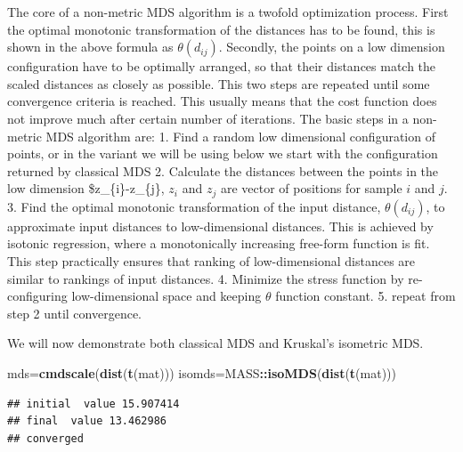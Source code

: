 \documentclass[12pt,]{krantz}
\newenvironment{Shaded}{\begin{snugshade}}{\end{snugshade}}
\newcommand{\CommentTok}[1]{\textcolor[rgb]{0.56,0.35,0.01}{\textit{#1}}}
\newcommand{\DataTypeTok}[1]{\textcolor[rgb]{0.13,0.29,0.53}{#1}}
\newcommand{\DecValTok}[1]{\textcolor[rgb]{0.00,0.00,0.81}{#1}}
\newcommand{\KeywordTok}[1]{\textcolor[rgb]{0.13,0.29,0.53}{\textbf{#1}}}
\newcommand{\NormalTok}[1]{#1}
\newcommand{\OperatorTok}[1]{\textcolor[rgb]{0.81,0.36,0.00}{\textbf{#1}}}
\newcommand{\StringTok}[1]{\textcolor[rgb]{0.31,0.60,0.02}{#1}}
\theoremstyle{definition}
\theoremstyle{definition}
\theoremstyle{definition}
\theoremstyle{remark}
\begin{document}
The core of a non-metric MDS algorithm is a twofold optimization
process. First the optimal monotonic transformation of the distances has
to be found, this is shown in the above formula as \(\theta(d_{ij})\).
Secondly, the points on a low dimension configuration have to be
optimally arranged, so that their distances match the scaled distances
as closely as possible. This two steps are repeated until some
convergence criteria is reached. This usually means that the cost
function does not improve much after certain number of iterations. The
basic steps in a non-metric MDS algorithm are: 1. Find a random low
dimensional configuration of points, or in the variant we will be using
below we start with the configuration returned by classical MDS 2.
Calculate the distances between the points in the low dimension
\$\textbar{}z\_\{i\}-z\_\{j\}\textbar{}, \(z_{i}\) and \(z_{j}\) are
vector of positions for sample \(i\) and \(j\). 3. Find the optimal
monotonic transformation of the input distance,
\({\textstyle \theta(d_{ij})}\), to approximate input distances to
low-dimensional distances. This is achieved by isotonic regression,
where a monotonically increasing free-form function is fit. This step
practically ensures that ranking of low-dimensional distances are
similar to rankings of input distances. 4. Minimize the stress function
by re-configuring low-dimensional space and keeping \(\theta\) function
constant. 5. repeat from step 2 until convergence.

We will now demonstrate both classical MDS and Kruskal's isometric MDS.

\begin{Shaded}
\begin{Highlighting}[]
\NormalTok{mds=}\KeywordTok{cmdscale}\NormalTok{(}\KeywordTok{dist}\NormalTok{(}\KeywordTok{t}\NormalTok{(mat)))}
\NormalTok{isomds=MASS}\OperatorTok{::}\KeywordTok{isoMDS}\NormalTok{(}\KeywordTok{dist}\NormalTok{(}\KeywordTok{t}\NormalTok{(mat)))}
\end{Highlighting}
\end{Shaded}

\begin{verbatim}
## initial  value 15.907414 
## final  value 13.462986 
## converged
\end{verbatim}

\begin{Shaded}
\end{Shaded}
\end{document}
